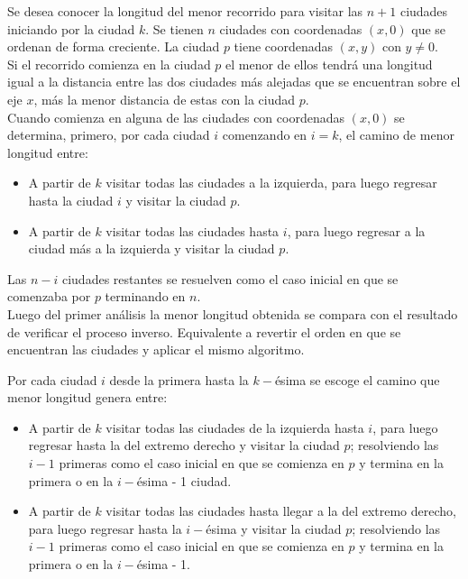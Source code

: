 \documentclass[runningheads,a4paper]{llncs}
\begin{document}
{ Se desea conocer la longitud del menor recorrido para visitar las $n+1$ ciudades iniciando por la ciudad $k$. Se tienen $n$ ciudades con coordenadas $(x,0)$ que se ordenan de forma creciente. La ciudad $p$ tiene coordenadas $(x,y)$ con $y \neq 0$.\\
 
  Si el recorrido comienza en la ciudad $p$ el menor de ellos tendr\'a una longitud igual a la distancia entre las dos ciudades m\'as alejadas que se encuentran sobre el eje $x$, m\'as la menor distancia de estas con la ciudad $p$.\\
 
Cuando comienza en alguna de las ciudades con coordenadas $(x,0)$ se determina, primero, por cada ciudad $i$ comenzando en $i = k$, el camino de menor longitud entre:
\begin{itemize}
\item A partir de $k$ visitar todas las ciudades a la izquierda, para luego regresar hasta la ciudad $i$ y visitar la ciudad $p$.
\item A partir de $k$ visitar todas las ciudades hasta $i$, para luego regresar a la ciudad m\'as a la izquierda y visitar la ciudad $p$.\\
\end{itemize}

Las $n - i$ ciudades restantes se resuelven como el caso inicial en que se comenzaba por $p$ terminando en $n$.\\

Luego del primer an\'alisis la menor longitud obtenida se compara con el resultado de verificar el proceso inverso. Equivalente a revertir el orden en que se encuentran las ciudades y aplicar el mismo algoritmo.
 
Por cada ciudad $i$ desde la primera hasta la $k-$\'esima se escoge el camino que menor longitud genera entre:   
\begin{itemize}
\item A partir de $k$ visitar todas las ciudades de la izquierda hasta $i$, para luego regresar hasta la del extremo derecho y visitar la ciudad $p$; resolviendo las $i-1$ primeras como el caso inicial en que se comienza en $p$ y termina en la primera o en la $i-$\'esima - 1 ciudad.\\
\item A partir de $k$ visitar todas las ciudades hasta llegar a la del extremo derecho, para luego regresar hasta la $i-$\'esima y visitar la ciudad $p$; resolviendo las $i-1$ primeras como el caso inicial en que se comienza en $p$ y termina en la primera o en la $i-$\'esima - 1.\\


\end{itemize}}
\end{document}
